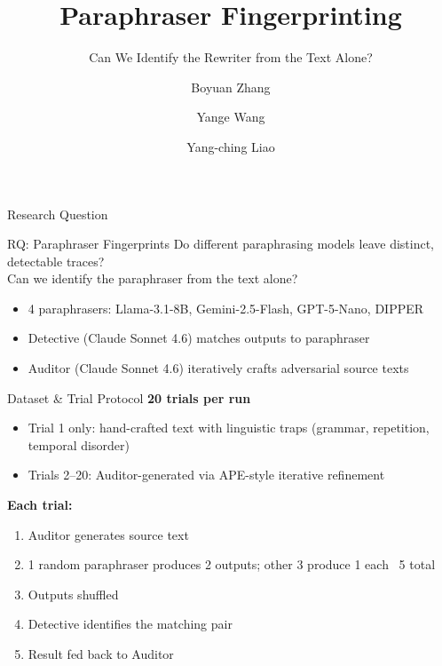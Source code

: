 \documentclass[aspectratio=169]{beamer}
\title{Paraphraser Fingerprinting}
\subtitle{Can We Identify the Rewriter from the Text Alone?}
\author{Boyuan Zhang \and Yange Wang \and Yang-ching Liao}
\institute{Northeastern University, Seattle WA}
\date{}
\begin{document}
\begin{frame}
  \titlepage
\end{frame}

\begin{frame}{Research Question}
  \begin{block}{RQ: Paraphraser Fingerprints}
    Do different paraphrasing models leave distinct, detectable traces?\\
    Can we identify the paraphraser from the text alone?
  \end{block}
  \vspace{1em}
  \begin{itemize}
    \item 4 paraphrasers: Llama-3.1-8B, Gemini-2.5-Flash, GPT-5-Nano, DIPPER
    \item Detective (Claude Sonnet 4.6) matches outputs to paraphraser
    \item Auditor (Claude Sonnet 4.6) iteratively crafts adversarial source texts
  \end{itemize}
\end{frame}

\begin{frame}{Dataset \& Trial Protocol}
  \textbf{20 trials per run}
  \begin{itemize}
    \item Trial 1 only: hand-crafted text with linguistic traps (grammar, repetition, temporal disorder)
    \item Trials 2--20: Auditor-generated via APE-style iterative refinement
  \end{itemize}
  \vspace{0.8em}
  \textbf{Each trial:}
  \begin{enumerate}
    \item Auditor generates source text
    \item 1 random paraphraser produces 2 outputs; other 3 produce 1 each \textrightarrow\ 5 total
    \item Outputs shuffled
    \item Detective identifies the matching pair
    \item Result fed back to Auditor
  \end{enumerate}
\end{frame}
\end{document}
